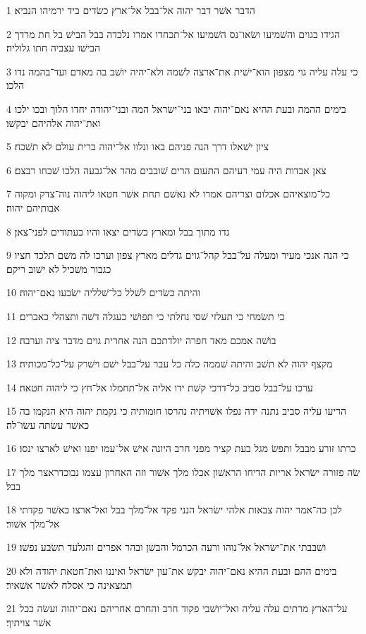 \par 1 הדבר אשׁר דבר יהוה אל־בבל אל־ארץ כשׂדים ביד ירמיהו הנביא׃
\par 2 הגידו בגוים והשׁמיעו ושׂאו־נס השׁמיעו אל־תכחדו אמרו נלכדה בבל הבישׁ בל חת מרדך הבישׁו עצביה חתו גלוליה׃
\par 3 כי עלה עליה גוי מצפון הוא־ישׁית את־ארצה לשׁמה ולא־יהיה יושׁב בה מאדם ועד־בהמה נדו הלכו׃
\par 4 בימים ההמה ובעת ההיא נאם־יהוה יבאו בני־ישׂראל המה ובני־יהודה יחדו הלוך ובכו ילכו ואת־יהוה אלהיהם יבקשׁו׃
\par 5 ציון ישׁאלו דרך הנה פניהם באו ונלוו אל־יהוה ברית עולם לא תשׁכח׃
\par 6 צאן אבדות היה עמי רעיהם התעום הרים שׁובבים מהר אל־גבעה הלכו שׁכחו רבצם׃
\par 7 כל־מוצאיהם אכלום וצריהם אמרו לא נאשׁם תחת אשׁר חטאו ליהוה נוה־צדק ומקוה אבותיהם יהוה׃
\par 8 נדו מתוך בבל ומארץ כשׂדים יצאו והיו כעתודים לפני־צאן׃
\par 9 כי הנה אנכי מעיר ומעלה על־בבל קהל־גוים גדלים מארץ צפון וערכו לה משׁם תלכד חציו כגבור משׁכיל לא ישׁוב ריקם׃
\par 10 והיתה כשׂדים לשׁלל כל־שׁלליה ישׂבעו נאם־יהוה׃
\par 11 כי תשׂמחי כי תעלזי שׁסי נחלתי כי תפושׁי כעגלה דשׁה ותצהלי כאברים׃
\par 12 בושׁה אמכם מאד חפרה יולדתכם הנה אחרית גוים מדבר ציה וערבה׃
\par 13 מקצף יהוה לא תשׁב והיתה שׁממה כלה כל עבר על־בבל ישׁם וישׁרק על־כל־מכותיה׃
\par 14 ערכו על־בבל סביב כל־דרכי קשׁת ידו אליה אל־תחמלו אל־חץ כי ליהוה חטאה׃
\par 15 הריעו עליה סביב נתנה ידה נפלו אשׁויתיה נהרסו חומותיה כי נקמת יהוה היא הנקמו בה כאשׁר עשׂתה עשׂו־לה׃
\par 16 כרתו זורע מבבל ותפשׂ מגל בעת קציר מפני חרב היונה אישׁ אל־עמו יפנו ואישׁ לארצו ינסו׃
\par 17 שׂה פזורה ישׂראל אריות הדיחו הראשׁון אכלו מלך אשׁור וזה האחרון עצמו נבוכדראצר מלך בבל׃
\par 18 לכן כה־אמר יהוה צבאות אלהי ישׂראל הנני פקד אל־מלך בבל ואל־ארצו כאשׁר פקדתי אל־מלך אשׁור׃
\par 19 ושׁבבתי את־ישׂראל אל־נוהו ורעה הכרמל והבשׁן ובהר אפרים והגלעד תשׂבע נפשׁו׃
\par 20 בימים ההם ובעת ההיא נאם־יהוה יבקשׁ את־עון ישׂראל ואיננו ואת־חטאת יהודה ולא תמצאינה כי אסלח לאשׁר אשׁאיר׃
\par 21 על־הארץ מרתים עלה עליה ואל־יושׁבי פקוד חרב והחרם אחריהם נאם־יהוה ועשׂה ככל אשׁר צויתיך׃
